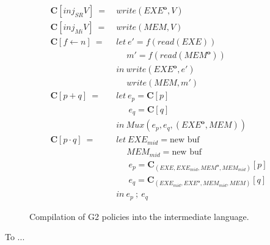\documentclass[sigconf,usenames,dvipsnames,svgnames,table]{acmart}
\newcommand{\obf}[1]{#1^\mathbf{o}}
\def \sysname {\textsc{G2}\xspace}
\begin{document}
        \begin{figure}
          \begin{align*}
            \mathbf{C}[inj_{SR}V]\ 
              =\ &
              write(\obf{EXE}, V)\\
            \mathbf{C}[inj_{Mi}V]\ 
              =\ &
              write(MEM, V)\\
            \mathbf{C}[f \leftarrow n]\ 
              =\ &
              let\    e' = f(read(EXE))\\
              &\quad\ m' = f(read(\obf{MEM}))\\
              &in\ write(\obf{EXE}, e')\\
              &\quad \ write(MEM, m')\\
            \mathbf{C}[p + q]\ 
              =\ &
              let\      e_p = \mathbf{C}[p]\\
              &\quad\ \ e_q = \mathbf{C}[q]\\
              &in\ Mux(e_p, e_q, (\obf{EXE},MEM))\\
            \mathbf{C}[p \cdot q]\ 
              =\ &
              let\    EXE_{mid} = \text{new buf}\\
              &\quad\ MEM_{mid} = \text{new buf}\\
              &\quad\ \ e_p = \mathbf{C}_{( EXE, EXE_{mid}, \obf{MEM}, MEM_{mid}      )}[p]\\
              &\quad\ \ e_q = \mathbf{C}_{(      EXE_{mid}, \obf{EXE}, MEM_{mid}, MEM )}[q]\\
              &in\ e_p\ ;\ e_q
          \end{align*}
          \caption{Compilation of \sysname policies into the intermediate language.}
          \label{fig:comp:comp:pol}
        \end{figure}




\begin{acks}
To ...
\end{acks}
\end{document}
